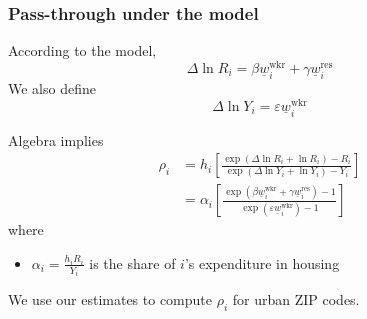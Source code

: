 \documentclass[aspectratio=169, t]{beamer}
\newcommand{\MW}{\underline{w}}
\begin{document}
\begin{frame}
	\frametitle{Pass-through under the model}

	According to the model,
	$$
	\Delta \ln R_i = \beta \MW_i^{\text{wkr}} + \gamma \MW_i^{\text{res}}
	$$
	We also define
	$$
	\Delta \ln Y_i = \varepsilon \MW_i^{\text{wkr}}
	$$

	\pause
	\vspace{2mm}
	Algebra implies
	\begin{equation*}
		\begin{split}
			\rho_i & = h_i \left[ 
				\frac{\exp \left(\Delta \ln R_i + \ln R_i \right) - R_i }{\exp \left( \Delta \ln Y_i + \ln Y_i \right) - Y_i }
				\right] \\
				& = \alpha_i \left[
					\frac{\exp \left( \beta \MW_i^{\text{wkr}} + \gamma \MW_i^{\text{res}} \right) - 1 }{\exp \left( \varepsilon \MW_i^{\text{wkr}} \right) - 1 }
				\right]
		\end{split}
	\end{equation*}
	where
	\begin{itemize}
		\item $\alpha_i = \frac{h_i R_i}{Y_i}$ is the share of $i$'s expenditure in housing
	\end{itemize}

	\vspace{2mm}
	We use our estimates to compute $\rho_i$ for urban ZIP codes.
\end{frame}
\end{document}
